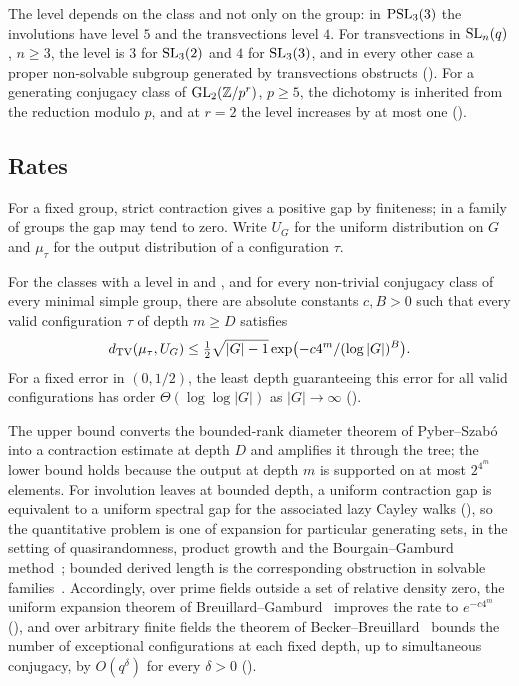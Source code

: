 The level depends on the class and not only on the group: in $\operatorname{PSL}_3(3)$
the involutions have level $5$ and the transvections level $4$. For
transvections in $\operatorname{SL}_n(q)$, $n\ge3$, the level is $3$ for $\operatorname{SL}_3(2)$
and $4$ for $\operatorname{SL}_3(3)$, and in every other case a proper non-solvable
subgroup generated by transvections obstructs
(). For a generating conjugacy class of
$\operatorname{GL}_2(\mathbb{Z}/p^r)$, $p\ge5$, the dichotomy is inherited from the reduction
modulo $p$, and at $r=2$ the level increases by at most one
().

\subsection*{Rates}
For a fixed group, strict contraction gives a positive gap by
finiteness; in a family of groups the gap may tend to zero. Write $U_G$
for the uniform distribution on $G$ and $\mu_\tau$ for the output
distribution of a configuration $\tau$.

\begin{lettertheorem}
\label{ithm:D}
For the classes with a level in  and
, and for every non-trivial conjugacy
class of every minimal simple group, there are absolute constants
$c,B>0$ such that every valid configuration $\tau$ of depth $m\ge D$
satisfies
\[
 d_{\mathrm{TV}}(\mu_\tau,U_G)\le\tfrac12\sqrt{|G|-1}
                  \exp\bigl(-c4^m/(\log|G|)^B\bigr).
\]
For a fixed error in $(0,1/2)$, the least depth guaranteeing this error
for all valid configurations has order $\Theta(\log\log|G|)$ as
$|G|\to\infty$
\textup{()}.
\end{lettertheorem}

The upper bound converts the bounded-rank diameter theorem of
Pyber--Szab\'o~\cite{PyberSzabo2016} into a contraction estimate at depth
$D$ and amplifies it through the tree; the lower bound holds because the
output at depth $m$ is supported on at most $2^{4^m}$ elements. For
involution leaves at bounded depth, a uniform contraction gap is
equivalent to a uniform spectral gap for the associated lazy Cayley
walks (), so the quantitative problem is one
of expansion for particular generating sets, in the setting of
quasirandomness, product growth and the Bourgain--Gamburd
method~\cite{Gowers2008,BabaiNikolovPyber2008,Helfgott2008,BGT2011,
BourgainGamburd,BourgainGamburdJEMS2008,BourgainVarju2012,SalehiVarju,
BGGT2015,KLN2006}; bounded derived length is the corresponding
obstruction in solvable families~\cite{LubotzkyWeiss1993}. Accordingly,
over prime fields outside a set of relative density zero, the uniform
expansion theorem of Breuillard--Gamburd~\cite{BreuillardGamburd2010}
improves the rate to $e^{-c4^m}$ (), and over
arbitrary finite fields the theorem of
Becker--Breuillard~\cite{BeckerBreuillard2026} bounds the number of
exceptional configurations at each fixed depth, up to simultaneous
conjugacy, by $O(q^\delta)$ for every $\delta>0$
().

